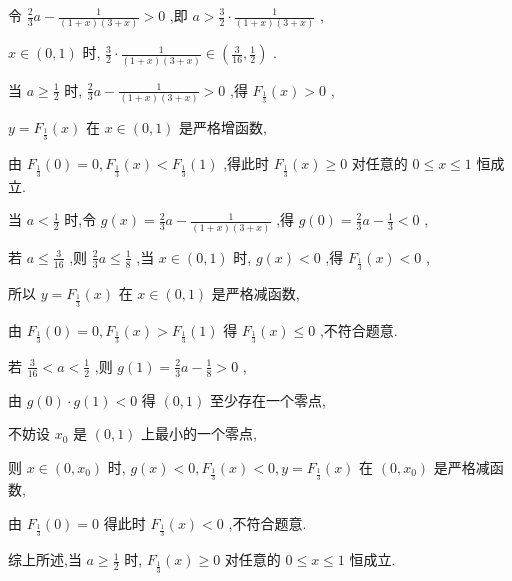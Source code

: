 \documentclass[10pt]{article}
\begin{document}
令 \(\frac{2}{3}a - \frac{1}{\left( {1 + x}\right) \left( {3 + x}\right) } > 0\) ,即 \(a > \frac{3}{2} \cdot  \frac{1}{\left( {1 + x}\right) \left( {3 + x}\right) }\) ,

\(x \in  \left( {0,1}\right)\) 时, \(\frac{3}{2} \cdot  \frac{1}{\left( {1 + x}\right) \left( {3 + x}\right) } \in  \left( {\frac{3}{16},\frac{1}{2}}\right)\) .

当 \(a \geq  \frac{1}{2}\) 时, \(\frac{2}{3}a - \frac{1}{\left( {1 + x}\right) \left( {3 + x}\right) } > 0\) ,得 \({F}_{\frac{1}{3}}\left( x\right)  > 0\) ,

\(y = {F}_{\frac{1}{3}}\left( x\right)\) 在 \(x \in  \left( {0,1}\right)\) 是严格增函数,

由 \({F}_{\frac{1}{3}}\left( 0\right)  = 0,{F}_{\frac{1}{3}}\left( x\right)  < {F}_{\frac{1}{3}}\left( 1\right)\) ,得此时 \({F}_{\frac{1}{3}}\left( x\right)  \geq  0\) 对任意的 \(0 \leq  x \leq  1\) 恒成立.

当 \(a < \frac{1}{2}\) 时,令 \(g\left( x\right)  = \frac{2}{3}a - \frac{1}{\left( {1 + x}\right) \left( {3 + x}\right) }\) ,得 \(g\left( 0\right)  = \frac{2}{3}a - \frac{1}{3} < 0\) ,

若 \(a \leq  \frac{3}{16}\) ,则 \(\frac{2}{3}a \leq  \frac{1}{8}\) ,当 \(x \in  \left( {0,1}\right)\) 时, \(g\left( x\right)  < 0\) ,得 \({F}_{\frac{1}{3}}\left( x\right)  < 0\) ,

所以 \(y = {F}_{\frac{1}{3}}\left( x\right)\) 在 \(x \in  \left( {0,1}\right)\) 是严格减函数,

由 \({F}_{\frac{1}{3}}\left( 0\right)  = 0,{F}_{\frac{1}{3}}\left( x\right)  > {F}_{\frac{1}{3}}\left( 1\right)\) 得 \({F}_{\frac{1}{3}}\left( x\right)  \leq  0\) ,不符合题意.

若 \(\frac{3}{16} < a < \frac{1}{2}\) ,则 \(g\left( 1\right)  = \frac{2}{3}a - \frac{1}{8} > 0\) ,

由 \(g\left( 0\right)  \cdot  g\left( 1\right)  < 0\) 得 \(\left( {0,1}\right)\) 至少存在一个零点,

不妨设 \({x}_{0}\) 是 \(\left( {0,1}\right)\) 上最小的一个零点,

则 \(x \in  \left( {0,{x}_{0}}\right)\) 时, \(g\left( x\right)  < 0,{F}_{\frac{1}{3}}\left( x\right)  < 0,y = {F}_{\frac{1}{3}}\left( x\right)\) 在 \(\left( {0,{x}_{0}}\right)\) 是严格减函数,

由 \({F}_{\frac{1}{3}}\left( 0\right)  = 0\) 得此时 \({F}_{\frac{1}{3}}\left( x\right)  < 0\) ,不符合题意.

综上所述,当 \(a \geq  \frac{1}{2}\) 时, \({F}_{\frac{1}{3}}\left( x\right)  \geq  0\) 对任意的 \(0 \leq  x \leq  1\) 恒成立.
\end{document}

